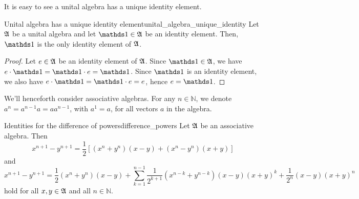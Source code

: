 It is easy to see a unital algebra has a unique identity element.
\begin{proposition}{Unital algebra has a unique identity element}{unital_algebra_unique_identity}
    Let \(\mathfrak{A}\) be a unital algebra and let \(\unity \in \algebra{A}\) be an identity element. Then, \(\unity\) is the only identity element of \(\mathfrak{A}\).
\end{proposition}
\begin{proof}
    Let \(e \in \mathfrak{A}\) be an identity element of \(\mathfrak{A}\). Since \(\unity \in \algebra{A}\), we have \(e \cdot \unity = \unity \cdot e = \unity\). Since \(\unity\) is an identity element, we also have \(e \cdot \unity = \unity \cdot e = e\), hence \(e = \unity\).
\end{proof}

We'll henceforth consider associative algebras. For any \(n \in \mathbb{N}\), we denote \(a^n = a^{n-1}a = aa^{n-1}\), with \(a^1 = a\), for all vectors \(a\) in the algebra.
\begin{proposition}{Identities for the difference of powers}{difference_powers}
    Let \(\mathfrak{A}\) be an associative algebra. Then
    \begin{equation*}
        x^{n+1} - y^{n+1} = \frac12 \left[(x^n + y^n)(x - y) + (x^n - y^n)(x+y)\right]
    \end{equation*}
    and
    \begin{equation*}
        x^{n+1} - y^{n+1} = \frac12(x^n + y^n)(x-y) + \sum_{k=1}^{n-1}\frac{1}{2^{k+1}}(x^{n-k}+y^{n-k})(x-y)(x+y)^k + \frac1{2^n}(x - y)(x+y)^n
    \end{equation*}
    hold for all \(x,y \in \mathfrak{A}\) and all \(n \in \mathbb{N}\).
\end{proposition}
